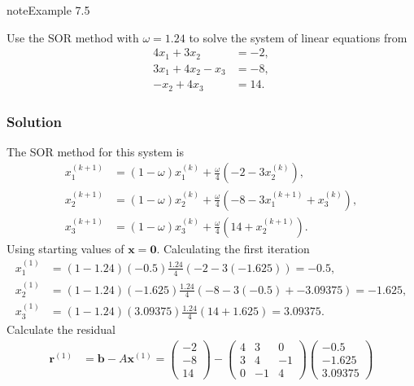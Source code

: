 \documentclass[letterpaper,10pt,english]{jupyterBook}
\begin{document}
\begin{sphinxadmonition}{note}{Example 7.5}

\sphinxAtStartPar
Use the SOR method with \(\omega = 1.24\) to solve the system of linear equations from {\hyperref[\detokenize{7_Indirect_methods/7.1_Jacobi_method:jacobi-method-example}]{}}
\begin{align*}
    4x_1 +3x_2 &=-2,\\
    3x_1 +4x_2 -x_3 &=-8,\\
    -x_2 +4x_3 &=14.
\end{align*}\subsubsection*{Solution}

\sphinxAtStartPar
The SOR method for this system is
\begin{align*}
    x_{1}^{(k+1)} &= (1 - \omega)x_{1}^{(k)} + \frac{\omega}{4} \left( -2 - 3 x_{2}^{(k)} \right), \\
    x_{2}^{(k+1)} &= (1 - \omega)x_{2}^{(k)} + \frac{\omega}{4} \left( -8 - 3 x_{1}^{(k+1)} + x_{3}^{(k)} \right), \\
    x_{3}^{(k+1)} &= (1 - \omega)x_{3}^{(k)} + \frac{\omega}{4} \left( 14 + x_{2}^{(k+1)} \right).
\end{align*}
\sphinxAtStartPar
Using starting values of \(\mathbf{x} = \mathbf{0}\). Calculating the first iteration
\begin{align*}
    x_{1}^{(1)} &= (1 - 1.24)(-0.5) \frac{1.24}{4} \left( -2 - 3 (-1.625) \right) = -0.5, \\
    x_{2}^{(1)} &= (1 - 1.24)(-1.625) \frac{1.24}{4} \left( -8 - 3 (-0.5) + -3.09375 \right) = -1.625, \\
    x_{3}^{(1)} &= (1 - 1.24)(3.09375) \frac{1.24}{4} \left( 14 + 1.625 \right) = 3.09375.
\end{align*}
\sphinxAtStartPar
Calculate the residual
\begin{align*}
    \mathbf{r}^{(1)} &= \mathbf{b} - A \mathbf{x}^{(1)} = 
    \begin{pmatrix} -2 \\ -8 \\ 14 \end{pmatrix} -
    \begin{pmatrix} 4 & 3 & 0 \\ 3 & 4 & -1 \\ 0 & -1 & 4 \end{pmatrix}
    \begin{pmatrix} -0.5 \\ -1.625 \\ 3.09375 \end{pmatrix} \\

\end{align*}
\end{sphinxadmonition}
\end{document}
